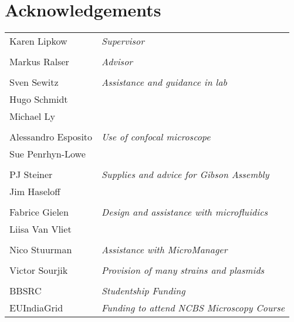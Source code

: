 \documentclass[../main.tex]{subfiles}
\begin{document}
\section*{Acknowledgements}

\begin{tabular}{p{5cm}l}
Karen Lipkow					&	\textit{Supervisor}\\&\\
Markus Ralser				&	\textit{Advisor}\\&\\
Sven Sewitz					& 	{\textit{Assistance and guidance in lab}}\\
Hugo Schmidt					&	\\
Michael Ly					&	\\&\\
Alessandro Esposito			&	{\textit{Use of confocal microscope}}\\
Sue Penrhyn-Lowe				&	\\&\\
PJ Steiner					&	{\textit{Supplies and advice for Gibson Assembly}}\\
Jim Haseloff					&	\\&\\
Fabrice Gielen				&	{\textit{Design and assistance with microfluidics}}\\
Liisa Van Vliet				&	\\&\\
Nico Stuurman				&	\textit{Assistance with MicroManager}\\&\\
Victor Sourjik				&	\textit{Provision of many strains and plasmids}\\&\\
BBSRC						&	\textit{Studentship Funding}\\
EUIndiaGrid					&	\textit{Funding to attend NCBS Microscopy Course}
\end{tabular}
\end{document}
